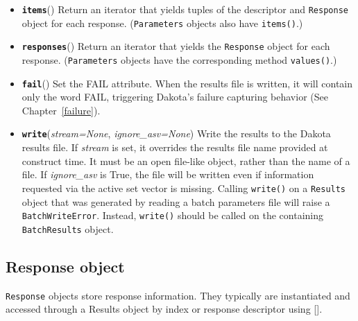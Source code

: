 \begin{itemize}
  \item{}
	  \label{index:dakota.interfacing.Results.items}\textbf{\texttt{items}}{()}{}
          Return an iterator that yields tuples of the descriptor and {\tt Response} object for each response. ({\tt Parameters} objects also have {\tt items()}.)

  \item{}
	  \label{index:dakota.interfacing.Results.responses}\textbf{\texttt{responses}}{()}{}
          Return an iterator that yields the {\tt Response} object for each response. ({\tt Parameters} objects have the corresponding method {\tt values()}.)

  \item{}
	  \label{index:dakota.interfacing.Results.fail}\textbf{\texttt{fail}}{()}{}
	  Set the FAIL attribute. When the results file is written, it will contain only the word FAIL, triggering Dakota's failure capturing behavior (See Chapter~\ref{failure}).

\item {}
	\label{index:dakota.interfacing.Results.write}\textbf{\texttt{write}}({\emph{stream=None}, \emph{ignore\_asv=None}}){}
Write the results to the Dakota results file. If \emph{stream} is set, it overrides the results file name provided at construct time. It must be an open file-like object, rather than the name of a file. If \emph{ignore\_asv} is True, the file will be written even if information requested via the active set vector is missing. Calling {\tt write()} on a {\tt Results} object that was
generated by reading a batch parameters file will raise a {\tt BatchWriteError}. Instead, {\tt write()} should be called on
the containing {\tt BatchResults} object.

\end{itemize}

\subsection{Response object}

{\tt Response} objects store response information. They typically are instantiated and accessed through a Results object by index or response descriptor using {[}{]}.

